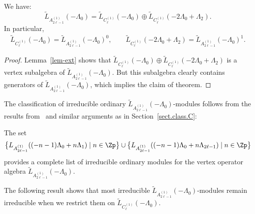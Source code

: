 \documentclass[pdftex]{sigma}
\begin{document}
\begin{theorem} \label{thm-ext} We have:
\[\widetilde{L}_{A_{2 \ell -1} ^{(1)}} (-\Lambda_0) =
\widetilde{L}_{C_{\ell} ^{(1)}} (-\Lambda_0) \oplus
\widetilde{L}_{C_{\ell} ^{(1)}} (-2\Lambda_0 + \Lambda_2).\] In
particular, \begin{gather*}  \widetilde{L}_{C_{\ell} ^{(1)}}
(-\Lambda_0)= \widetilde{L}_{A_{2 \ell -1} ^{(1)}} (-\Lambda_0)
^{0}, \qquad
  \widetilde{L}_{C_{\ell} ^{(1)}} (-2\Lambda_0 + \Lambda_2)=
\widetilde{L}_{A_{2 \ell -1} ^{(1)}} (-\Lambda_0) ^{1}.
\end{gather*}
\end{theorem}
\begin{proof}\sloppy
Lemma~\ref{lem-ext} shows that $\widetilde{L}_{C_{\ell} ^{(1)}}
(-\Lambda_0) \oplus \widetilde{L}_{C_{\ell} ^{(1)}} (-2\Lambda_0 +
\Lambda_2)$ is a vertex subalgebra of $\widetilde{L}_{A_{2 \ell -1}
^{(1)}} (-\Lambda_0)$. But this subalgebra clearly contains
generators of $\widetilde{L}_{A_{2 \ell -1} ^{(1)}} (-\Lambda_0)$,
which implies the claim of theo\-rem.
\end{proof}

{\sloppy The classif\/ication of irreducible ordinary $\widetilde{L}_{A_{2 \ell
-1} ^{(1)}} (-\Lambda_0)$-modules follows from the results from~\cite{AP} and similar arguments as in Section~\ref{sect.class.C}:

}

\begin{proposition}\sloppy
The set
\begin{gather*}
\big\{ L_{A_{2\ell -1} ^{(1)}}( (-n-1 ) \Lambda_0 + n \Lambda_1) \;
\vert \; n \in {\Zp} \big\}  \cup \big\{ L_{A_{2\ell -1} ^{(1)}}( (-n-1 )
\Lambda_0 + n \Lambda_{2 \ell -1}) \; \vert \; n \in {\Zp} \big\}
 \end{gather*}
 provides a complete list of irreducible ordinary modules for the vertex operator algebra
 $\widetilde{L}_{A_{2 \ell -1} ^{(1)}} (-\Lambda_0)$.
\end{proposition}



The following result shows that most irreducible
$\widetilde{L}_{A_{2 \ell -1} ^{(1)}} (-\Lambda_0)$-modules remain
irreducible when we restrict them on $\widetilde{L}_{C_{\ell}
^{(1)}} (-\Lambda_0)$.
\end{document}
